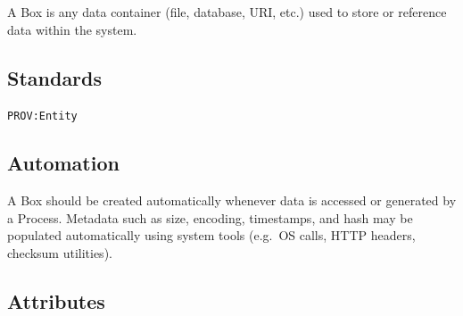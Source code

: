 A Box is any data container (file, database, URI, etc.) used to store or
reference data within the system.

\subsection{Standards}\label{standards-6}

\texttt{PROV:Entity}

\subsection{Automation}\label{automation-6}

A Box should be created automatically whenever data is accessed or
generated by a Process. Metadata such as size, encoding, timestamps, and
hash may be populated automatically using system tools (e.g.~OS calls,
HTTP headers, checksum utilities).

\subsection{Attributes}\label{attributes-6}

